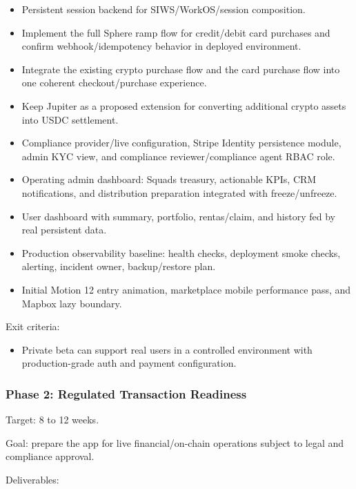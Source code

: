 \documentclass[
  10pt,
  letterpaper,
]{article}
\providecommand{\tightlist}{%
  \setlength{\itemsep}{0pt}\setlength{\parskip}{0pt}}
\begin{document}
\begin{itemize}
\tightlist
\item
  Persistent session backend for SIWS/WorkOS/session composition.
\item
  Implement the full Sphere ramp flow for credit/debit card purchases
  and confirm webhook/idempotency behavior in deployed environment.
\item
  Integrate the existing crypto purchase flow and the card purchase flow
  into one coherent checkout/purchase experience.
\item
  Keep Jupiter as a proposed extension for converting additional crypto
  assets into USDC settlement.
\item
  Compliance provider/live configuration, Stripe Identity persistence
  module, admin KYC view, and compliance reviewer/compliance agent RBAC
  role.
\item
  Operating admin dashboard: Squads treasury, actionable KPIs, CRM
  notifications, and distribution preparation integrated with
  freeze/unfreeze.
\item
  User dashboard with summary, portfolio, rentas/claim, and history fed
  by real persistent data.
\item
  Production observability baseline: health checks, deployment smoke
  checks, alerting, incident owner, backup/restore plan.
\item
  Initial Motion 12 entry animation, marketplace mobile performance
  pass, and Mapbox lazy boundary.
\end{itemize}

Exit criteria:

\begin{itemize}
\tightlist
\item
  Private beta can support real users in a controlled environment with
  production-grade auth and payment configuration.
\end{itemize}

\subsubsection{Phase 2: Regulated Transaction
Readiness}\label{phase-2-regulated-transaction-readiness}

Target: 8 to 12 weeks.

Goal: prepare the app for live financial/on-chain operations subject to
legal and compliance approval.

Deliverables:
\end{document}
